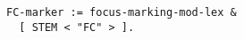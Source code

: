 \documentclass[a4paper]{article}
\begin{document}
{\small\begin{verbatim}
FC-marker := focus-marking-mod-lex &
  [ STEM < "FC" > ].
\end{verbatim}}
\end{document}

